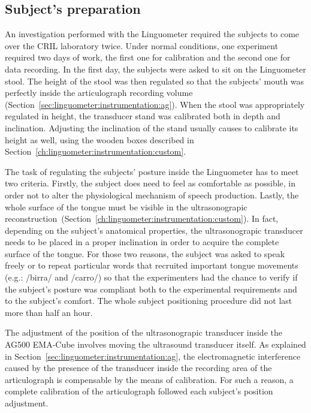 \subsection{Subject's preparation}
\label{sec:experiments:preparation}
An investigation performed with the Linguometer required the subjects to come
over the CRIL laboratory twice.
Under normal conditions, one experiment required two days of work, the first
one for calibration and the second one for data recording.
In the first day, the subjects were asked to sit on the Linguometer stool. 
The height of the stool was then regulated so that the subjects' mouth was
perfectly inside the articulograph recording volume
(Section~\ref{sec:linguometer:instrumentation:ag}).
When the stool was appropriately regulated in height, the transducer stand was
calibrated both in depth and inclination. 
Adjusting the inclination of the stand usually causes to calibrate its height as
well, using the wooden boxes described
in Section~\ref{ch:linguometer:instrumentation:custom}.


The task of regulating the subjects' posture inside the Linguometer has to meet
two criteria. Firstly, the subject does need to feel as comfortable as possible,
in order not to alter the physiological mechanism of speech production.
Lastly, the whole surface of the tongue must be visible in the ultrasonograpic
reconstruction~(Section~\ref{ch:linguometer:instrumentation:custom}).
In fact, depending on the subject's anatomical properties, the ultrasonograpic
transducer needs to be placed in a proper inclination in order to acquire
the complete surface of the tongue.
For those two reasons, the subject was asked to speak freely or to repeat
particular words that recruited important tongue movements
(e.g.: /birra/ and /carro/) so that the experimenters had the chance to verify
if the subject's posture was compliant both to the experimental requirements 
and to the subject's comfort.
The whole subject positioning procedure did not last more than half an hour. 

The adjustment of the position of the ultrasonograpic transducer inside the
AG500 EMA-Cube involves moving the ultrasound transducer itself.
As explained in Section~\ref{sec:linguometer:instrumentation:ag}, the electromagnetic
interference caused by the presence of the transducer inside the recording area
of the articulograph is compensable by the means of calibration.
For such a reason, a complete calibration of the articulograph followed each
subject's position adjustment.\\

